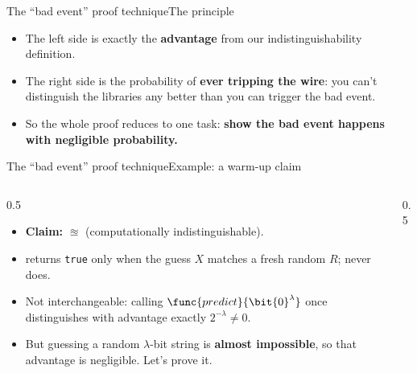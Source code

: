 \ifdefined\PRESENTATION\else\PassOptionsToClass{handout}{beamer}\fi\documentclass[aspectratio=169, lualatex]{beamer}
\begin{document}
\begin{frame}{The ``bad event'' proof technique}{The principle}
	\begin{itemize}[<+->]
		\item The left side is exactly the \textbf{advantage} from our indistinguishability definition.
		\item The right side is the probability of \textbf{ever tripping the wire}: you can't distinguish the libraries any better than you can trigger the bad event.
		\item So the whole proof reduces to one task: \textbf{show the bad event happens with negligible probability.}
	\end{itemize}
\end{frame}

\begin{frame}{The ``bad event'' proof technique}{Example: a warm-up claim}
	\begin{columns}[c]
		\begin{column}{0.5\textwidth}
			\begin{itemize}[<+->]
				\item \textbf{Claim:}  $\approxeq$  (computationally indistinguishable).
				\item {} returns \texttt{true} only when the guess $X$ matches a fresh random $R$;  never does.
				\item Not interchangeable: calling $\func{predict}{\bit{0}^\lambda}$ once distinguishes with advantage exactly $2^{-\lambda} \neq 0$.
				\item But guessing a random $\lambda$-bit string is \textbf{almost impossible}, so that advantage is negligible. Let's prove it.
			\end{itemize}
		\end{column}
		\begin{column}{0.5\textwidth}
		\end{column}
	\end{columns}
\end{frame}
\end{document}
